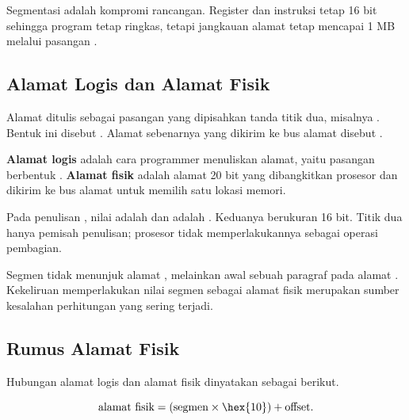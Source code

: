 \begin{infobox}
\vspace{1.1em}
Segmentasi adalah kompromi rancangan. Register dan instruksi tetap
16 bit sehingga program tetap ringkas, tetapi jangkauan alamat tetap
mencapai 1 MB melalui pasangan .
\end{infobox}

\subsection{Alamat Logis dan Alamat Fisik}

Alamat ditulis sebagai pasangan yang dipisahkan tanda titik dua,
misalnya . Bentuk ini disebut .
Alamat sebenarnya yang dikirim ke bus alamat disebut .

\begin{definisi}
\textbf{Alamat logis} adalah cara programmer menuliskan alamat,
yaitu pasangan  berbentuk
. \textbf{Alamat fisik} adalah alamat 20 bit
yang dibangkitkan prosesor dan dikirim ke bus alamat untuk memilih
satu lokasi memori.
\end{definisi}

Pada penulisan , nilai  adalah
 dan  adalah . Keduanya
berukuran 16 bit. Titik dua hanya pemisah penulisan; prosesor tidak
memperlakukannya sebagai operasi pembagian.

\begin{infobox}
\vspace{1.1em}
 Segmen  tidak
menunjuk alamat , melainkan awal sebuah paragraf pada
alamat . Kekeliruan memperlakukan nilai segmen sebagai
alamat fisik merupakan sumber kesalahan perhitungan yang sering
terjadi.
\end{infobox}

\subsection{Rumus Alamat Fisik}

Hubungan alamat logis dan alamat fisik dinyatakan sebagai berikut.

\begin{equation}
\label{eq:rumus-alamat-fisik}
\text{alamat fisik} = (\text{segmen} \times \hex{10}) +
\text{offset}.
\end{equation}

